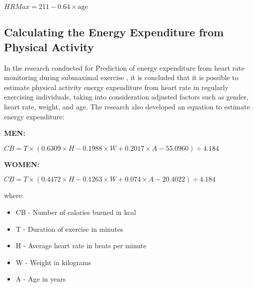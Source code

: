 \begin{center}
\(HRMax = 211 - 0.64 \times \text{{age}}\)
\end{center}
        
\subsection{Calculating the Energy Expenditure from Physical Activity}
\label{chap:energy_expenditure}
In the research conducted for Prediction of energy expenditure from heart rate monitoring during submaximal exercise \autocite{keytel2005energy}, it is concluded that it is possible to estimate physical activity energy expenditure from heart rate in regularly exercising individuals, taking into consideration adjusted factors such as gender, heart rate, weight, and age. The research \autocite{keytel2005energy} also developed an equation to estimate energy expenditure:

\textbf{MEN:}
\begin{center}
    \(CB = T \times (0.6309 \times H  -  0.1988 \times W  +  0.2017 \times A  -  55.0960) \div 4.184 \)
\end{center}

\textbf{WOMEN:}
\begin{center}
    \(CB = T \times (0.4472 \times H  -  0.1263 \times W  +  0.074 \times A  -  20.4022) \div 4.184 \)
\end{center}

where:
\begin{itemize}
    \item CB - Number of calories burned in kcal
    \item T - Duration of exercise in minutes
    \item H - Average heart rate in beats per minute
    \item W - Weight in kilograms
    \item A - Age in years
\end{itemize}